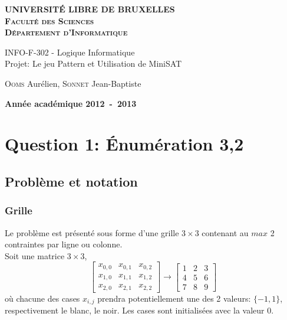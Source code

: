 \documentclass[a4paper,12pt]{report}
\begin{document}
\setlength\parindent{0pt} %


\begin{titlepage}
\begin{center}
\textbf{\textsc{UNIVERSIT\'E LIBRE DE BRUXELLES}}\\
\textbf{\textsc{Faculté des Sciences}}\\
\textbf{\textsc{Département d'Informatique}}
\vfill{}\vfill{}
\begin{center}{\Huge INFO-F-302 - Logique Informatique \\Projet: Le jeu Pattern et Utilisation de MiniSAT}\end{center}{\Huge \par}
\begin{center}{\large \textsc{Ooms} Aurélien, \textsc{Sonnet} Jean-Baptiste}\end{center}{\Huge \par}
\vfill{}\vfill{}
\vfill{}\vfill{}\enlargethispage{3cm}
\textbf{Année académique 2012~-~2013}
\end{center}
\end{titlepage}




\tableofcontents
\newpage


\chapter{Question 1: Énumération 3,2}

\section{Problème et notation}
\subsection{Grille}
Le problème est présenté sous forme d'une grille $3\times3$ contenant au $max$ 2 contraintes par ligne ou colonne.\\

Soit une matrice $3\times3$,  
$$\begin{bmatrix} x_{0,0} & x_{0,1} & x_{0,2} \\ x_{1,0} & x_{1,1} & x_{1,2} \\ x_{2,0} & x_{2,1} & x_{2,2}\end{bmatrix} \rightarrow \begin{bmatrix} 1 & 2 & 3 \\ 4 & 5 & 6 \\ 7 & 8 & 9\end{bmatrix}$$ 
où chacune des cases $x_{i,j}$ prendra potentiellement une des 2 valeurs: 
$\{-1,1\}$, respectivement le blanc, le noir. Les cases sont initialisées avec la valeur $0$.\\
\end{document}

